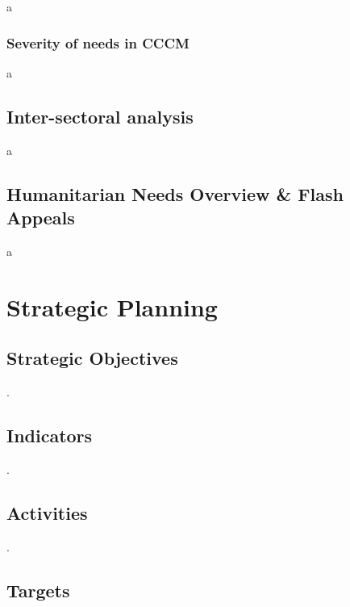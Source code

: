 \documentclass[
  a4paper,
  onecolumn,
  oneside]{book}
\begin{document}
a

\hypertarget{severity-of-needs-in-cccm}{%
\subsection{Severity of needs in CCCM}\label{severity-of-needs-in-cccm}}

a

\hypertarget{inter-sectoral-analysis}{%
\section{Inter-sectoral analysis}\label{inter-sectoral-analysis}}

a

\hypertarget{humanitarian-needs-overview-flash-appeals}{%
\section{Humanitarian Needs Overview \& Flash
Appeals}\label{humanitarian-needs-overview-flash-appeals}}

a

\hypertarget{strategic-planning}{%
\chapter{Strategic Planning}\label{strategic-planning}}

\hypertarget{strategic-objectives}{%
\section{Strategic Objectives}\label{strategic-objectives}}

.

\hypertarget{indicators-1}{%
\section{Indicators}\label{indicators-1}}

.

\hypertarget{activities-1}{%
\section{Activities}\label{activities-1}}

.

\hypertarget{targets}{%
\section{Targets}\label{targets}}
\end{document}
